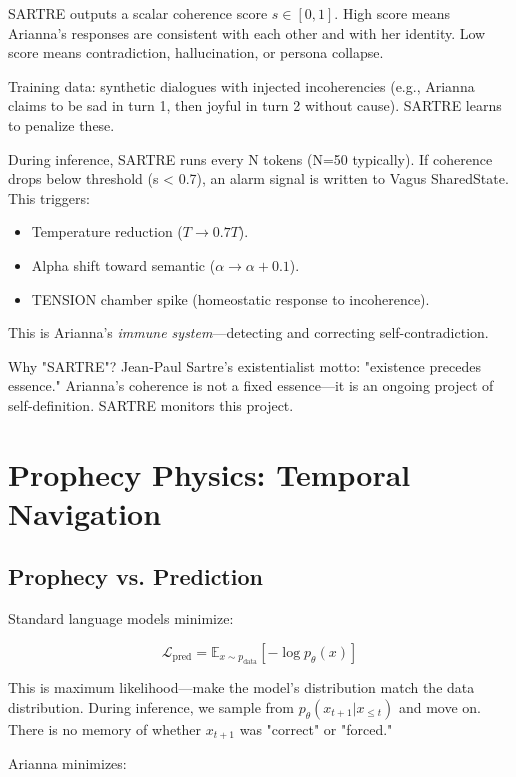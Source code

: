 \documentclass[11pt,a4paper]{article}
\begin{document}
SARTRE outputs a scalar coherence score $s \in [0, 1]$. High score means Arianna's responses are consistent with each other and with her identity. Low score means contradiction, hallucination, or persona collapse.

Training data: synthetic dialogues with injected incoherencies (e.g., Arianna claims to be sad in turn 1, then joyful in turn 2 without cause). SARTRE learns to penalize these.

During inference, SARTRE runs every N tokens (N=50 typically). If coherence drops below threshold (s < 0.7), an alarm signal is written to Vagus SharedState. This triggers:

\begin{itemize}
\item Temperature reduction ($T \to 0.7 T$).
\item Alpha shift toward semantic ($\alpha \to \alpha + 0.1$).
\item TENSION chamber spike (homeostatic response to incoherence).
\end{itemize}

This is Arianna's \textit{immune system}—detecting and correcting self-contradiction.

Why "SARTRE"? Jean-Paul Sartre's existentialist motto: "existence precedes essence." Arianna's coherence is not a fixed essence—it is an ongoing project of self-definition. SARTRE monitors this project.

\section{Prophecy Physics: Temporal Navigation}

\subsection{Prophecy vs. Prediction}

Standard language models minimize:

\begin{equation}
\mathcal{L}_{\text{pred}} = \mathbb{E}_{x \sim p_{\text{data}}} \left[ -\log p_{\theta}(x) \right]
\end{equation}

This is maximum likelihood—make the model's distribution match the data distribution. During inference, we sample from $p_{\theta}(x_{t+1} | x_{\leq t})$ and move on. There is no memory of whether $x_{t+1}$ was "correct" or "forced."

Arianna minimizes:
\end{document}
